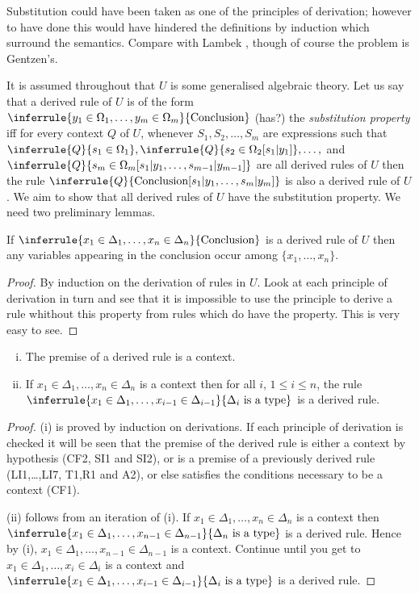 Substitution could have been taken as one of the principles of derivation; however to have done this would have hindered the definitions by induction which surround the semantics.
%
Compare with Lambek \cite{??}, though of course the problem is Gentzen's.

It is assumed throughout that $U$ is some generalised algebraic theory.
%
Let us say that a derived rule of $U$ is of the form $\inferrule{y_1\in\Omega_1,\ldots,y_m\in\Omega_m}{\text{Conclusion}}$ (has?)  the \emph{substitution property} iff for every context $Q$ of $U$, whenever $S_1,S_2,\ldots,S_m$ are expressions such that $\inferrule{Q}{s_1\in\Omega_1},\inferrule{Q}{s_2\in\Omega_2[s_1|y_1]},\ldots,$ and $\inferrule{Q}{s_m\in\Omega_m[s_1|y_1,\ldots,s_{m-1}|y_{m-1}]}$ are all derived rules of $U$ then the rule $\inferrule{Q}{\text{Conclusion}[s_1|y_1,\ldots,s_m|y_m]}$ is also a derived rule of $U$. We aim to show that all derived rules of $U$ have the substitution property. We need two preliminary lemmas.


\begin{lemma}[1] If $\inferrule{x_1\in\Delta_1,\ldots,x_n\in\Delta_n}{\text{Conclusion}}$ is a derived rule of $U$ then any variables appearing in the conclusion occur among $\{x_1,\ldots, x_n\}$.
\end{lemma}
\begin{proof}
  By induction on the derivation of rules in $U$.
  Look at each principle of derivation in turn and see that it is impossible to use the principle to derive a rule whithout this property from rules which do have the property.
  This is very easy to see.
\end{proof}

\begin{lemma}[2]
\begin{enumerate}[(i)]
\item The premise of a derived rule is a context.
\item If $x_1\in\Delta_1,\ldots,x_n\in\Delta_n$ is a context then for all $i$, $1\leq i\leq n$, the rule $\inferrule{x_1\in\Delta_1,\ldots,x_{i-1}\in\Delta_{i-1}}{\Delta_i\isatype}$ is a derived rule.
\end{enumerate}
\end{lemma}
\begin{proof}
  (i) is proved by induction on derivations.
  If each principle of derivation is checked it will be seen that the premise of the derived rule is either a context by hypothesis (CF2, SI1 and SI2), or is a premise of a previously derived rule (LI1,\ldots,LI7, T1,R1 and A2), or else satisfies the conditions necessary to be a context (CF1).

  (ii) follows from an iteration of (i).
  If $x_1\in\Delta_1,\ldots,x_n\in\Delta_n$ is a context then $\inferrule{x_1\in\Delta_1,\ldots,x_{n-1}\in\Delta_{n-1}}{\Delta_n\isatype}$ is a derived rule. Hence by (i), $x_1\in\Delta_1,\ldots,x_{n-1}\in\Delta_{n-1}$ is a context.
  Continue until you get to $x_1\in\Delta_1,\ldots,x_i\in\Delta_i$ is a context and $\inferrule{x_1\in\Delta_1,\ldots,x_{i-1}\in\Delta_{i-1}}{\Delta_i\isatype}$ is a derived rule.
\end{proof}

